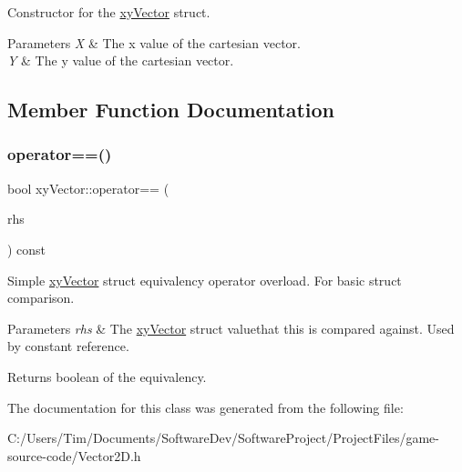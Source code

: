 Constructor for the \hyperlink{structxy_vector}{xy\+Vector} struct. 


\begin{DoxyParams}{Parameters}
{\em X} & The x value of the cartesian vector. \\
\hline
{\em Y} & The y value of the cartesian vector. \\
\hline
\end{DoxyParams}


\subsection{Member Function Documentation}
\mbox{\label{structxy_vector_a7aca10ebc499fdf7944792741edec285}} 
\subsubsection{\texorpdfstring{operator==()}{operator==()}}
{\footnotesize\ttfamily bool xy\+Vector\+::operator== (\begin{DoxyParamCaption}\item[{const \hyperlink{structxy_vector}{xy\+Vector} \&}]{rhs }\end{DoxyParamCaption}) const\hspace{0.3cm}{\ttfamily [inline]}}



Simple \hyperlink{structxy_vector}{xy\+Vector} struct equivalency operator overload. For basic struct comparison. 


\begin{DoxyParams}{Parameters}
{\em rhs} & The \hyperlink{structxy_vector}{xy\+Vector} struct valuethat this is compared against. Used by constant reference. \\
\hline
\end{DoxyParams}
\begin{DoxyReturn}{Returns}
boolean of the equivalency. 
\end{DoxyReturn}


The documentation for this class was generated from the following file\+:\begin{DoxyCompactItemize}
\item 
C\+:/\+Users/\+Tim/\+Documents/\+Software\+Dev/\+Software\+Project/\+Project\+Files/game-\/source-\/code/Vector2\+D.\+h\end{DoxyCompactItemize}
